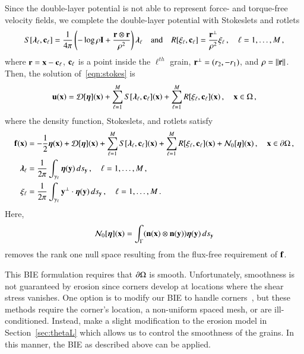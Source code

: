 \documentclass[preprint, 10pt]{elsarticle}
\begin{document}
Since the double-layer potential is not able to represent force- and
torque-free velocity fields,  we complete the double-layer potential
with Stokeslets and rotlets~\cite{pow-mir1987, pow1993}
\begin{align}
  S[{\boldsymbol\lambda}_\ell,{\mathbf{c}}_\ell] = \frac{1}{4\pi} \left(-\log \rho {\mathbf{I}} + 
    \frac{{\mathbf{r}} \otimes {\mathbf{r}}}{\rho^2} \right){\boldsymbol\lambda}_\ell
  \quad \text{and} \quad
  R[\xi_\ell,{\mathbf{c}}_\ell] = \frac{{\mathbf{r}}^\perp}{\rho^2}\xi_\ell\, , 
  \quad \ell=1,\ldots,M \, ,
  \label{eqn:stokeslet_rotlet}
\end{align}
where  ${\mathbf{r}} = {\mathbf{x}} - {\mathbf{c}}_\ell$, ${\mathbf{c}}_\ell$ is a point inside the
$\ell^{th}$ grain, ${\mathbf{r}}^\perp = (r_2,-r_1)$, and $\rho = \|{\mathbf{r}}\|$.
Then, the solution of~\eqref{eqn:stokes} is
\begin{align}
  \label{eqn:completed_DLP}
  {\mathbf{u}}({\mathbf{x}}) = {\mathcal{D}}[{\boldsymbol\eta}]({\mathbf{x}}) + 
    \sum_{\ell=1}^{M} S[{\boldsymbol\lambda}_\ell,{\mathbf{c}}_\ell]({\mathbf{x}}) +
    \sum_{\ell=1}^{M} R[\xi_\ell,{\mathbf{c}}_\ell]({\mathbf{x}})\, , \quad {\mathbf{x}} \in \Omega \, ,
\end{align}
where the density function, Stokeslets, and rotlets satisfy
\begin{subequations}
\label{eqn:completed_BIE}
\begin{align}
  {\mathbf{f}}({\mathbf{x}}) &= -\frac{1}{2}{\boldsymbol\eta}({\mathbf{x}}) + {\mathcal{D}}[{\boldsymbol\eta}]({\mathbf{x}}) + 
      \sum_{\ell=1}^{M} S[{\boldsymbol\lambda}_\ell,{\mathbf{c}}_\ell]({\mathbf{x}}) +
      \sum_{\ell=1}^{M} R[\xi_\ell,{\mathbf{c}}_\ell]({\mathbf{x}}) + {\mathcal{N}}_0[{\boldsymbol\eta}]({\mathbf{x}})\, ,
      \quad {\mathbf{x}} \in {\partial}\Omega \, , 
      \label{eqn:DLP}\\
  {\boldsymbol\lambda}_\ell &= \frac{1}{2\pi}\int_{\gamma_\ell} {\boldsymbol\eta}({\mathbf{y}}) \,
  ds_{\mathbf{y}}\, ,
  \quad \ell=1,\ldots,M \, ,
  \label{eqn:stokeslet} \\
  \xi_\ell &= \frac{1}{2\pi}\int_{\gamma_\ell} {\mathbf{y}}^\perp \cdot {\boldsymbol\eta}({\mathbf{y}})
  \, ds_{\mathbf{y}}\, , \quad \ell=1,\ldots,M \, .
  \label{eqn:rotlet}
\end{align}
\end{subequations}
Here,
\begin{align*}
  {\mathcal{N}}_0[{\boldsymbol\eta}]({\mathbf{x}}) = \int_{\Gamma} 
    ({\mathbf{n}}({\mathbf{x}}) \otimes {\mathbf{n}}({\mathbf{y}})){\boldsymbol\eta}({\mathbf{y}}) \, ds_{\mathbf{y}}
\end{align*}
removes the rank one null space resulting from the flux-free requirement
of ${\mathbf{f}}$.

This BIE formulation requires that ${\partial}\Omega$ is smooth.
Unfortunately, smoothness is not guaranteed by erosion since corners
develop at locations where the shear stress vanishes.  One option is to
modify our BIE to handle corners~\cite{rac-ser2017,
ser-rok2016, hel2011, gil-hao-mar2014, bre2012}, but these methods
require the corner's location, a non-uniform spaced mesh, or are
ill-conditioned.  Instead, make a slight modification to the erosion
model in Section~\ref{sec:thetaL} which allows us to control the
smoothness of the grains.  In this manner, the BIE as described above
can be applied.
\end{document}
